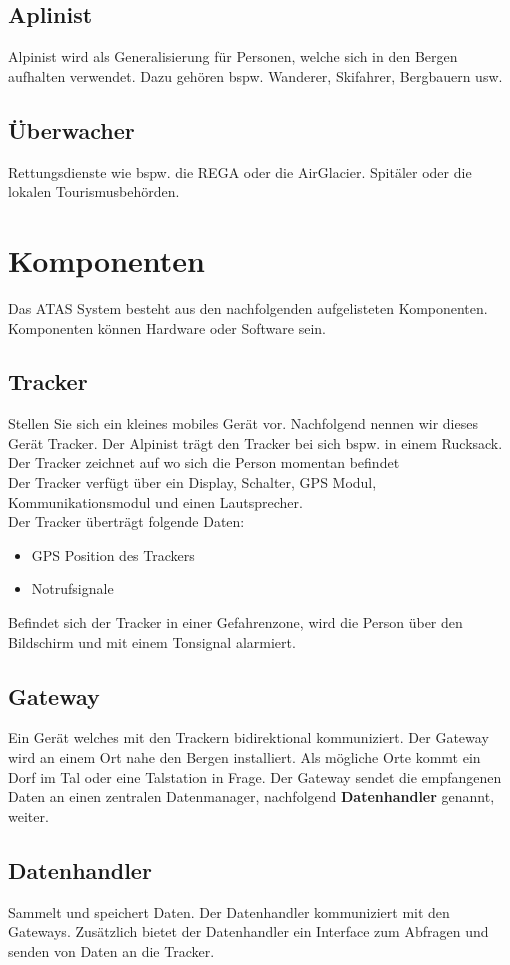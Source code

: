 \documentclass[11pt,english,german]{report}
\theoremstyle{definition}
\begin{document}
\subsection{Aplinist}
Alpinist wird als Generalisierung für Personen, welche sich in den Bergen aufhalten verwendet. Dazu gehören bspw. Wanderer, Skifahrer, Bergbauern usw.

\subsection{Überwacher}
Rettungsdienste wie bspw. die REGA oder die AirGlacier. Spitäler oder die lokalen Tourismusbehörden.

\section{Komponenten}
Das ATAS System besteht aus den nachfolgenden aufgelisteten Komponenten. Komponenten können Hardware oder Software sein.

\subsection{Tracker}
Stellen Sie sich ein kleines mobiles Gerät vor. Nachfolgend nennen wir dieses Gerät Tracker. Der Alpinist trägt den Tracker bei sich bspw. in einem Rucksack. Der Tracker zeichnet auf wo sich die Person momentan befindet\\ [0.3cm] 
Der Tracker verfügt über ein Display, Schalter, GPS Modul, Kommunikationsmodul und einen Lautsprecher.\\ [0.3cm]
Der Tracker überträgt folgende Daten:
\begin{itemize}
	\item GPS Position des Trackers
	\item Notrufsignale
\end{itemize}
Befindet sich der Tracker in einer Gefahrenzone, wird die Person über den Bildschirm und mit einem Tonsignal alarmiert.
\subsection{Gateway}
Ein Gerät welches mit den Trackern bidirektional kommuniziert. Der Gateway wird an einem Ort nahe den Bergen installiert. Als mögliche Orte kommt ein Dorf im Tal oder eine Talstation in Frage. Der Gateway sendet die empfangenen Daten an einen zentralen Datenmanager, nachfolgend \textbf{Datenhandler} genannt, weiter.

\subsection{Datenhandler}
Sammelt und speichert Daten. Der Datenhandler kommuniziert mit den Gateways. Zusätzlich bietet der Datenhandler ein Interface zum Abfragen und senden von Daten an die Tracker.
\end{document}
